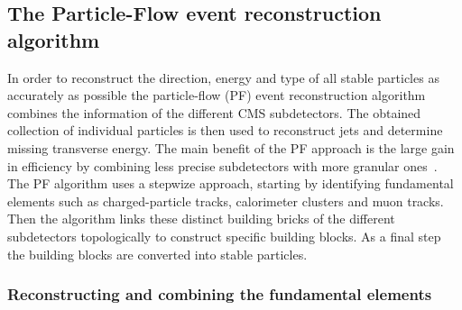 \subsection{The Particle-Flow event reconstruction algorithm} \label{subsec::PF}

In order to reconstruct the direction, energy and type of all stable particles as accurately as possible the particle-flow (PF) event reconstruction algorithm combines the information of the different CMS subdetectors. The obtained collection of individual particles is then used to reconstruct jets and determine missing transverse energy.
The main benefit of the PF approach is the large gain in efficiency by combining less precise subdetectors with more granular ones~\cite{}.
\\
The PF algorithm uses a stepwize approach, starting by identifying fundamental elements such as charged-particle tracks, calorimeter clusters and muon tracks. Then the algorithm links these distinct building bricks of the different subdetectors topologically to construct specific building blocks. As a final step the building blocks are converted into stable particles.

\subsubsection*{Reconstructing and combining the fundamental elements}

